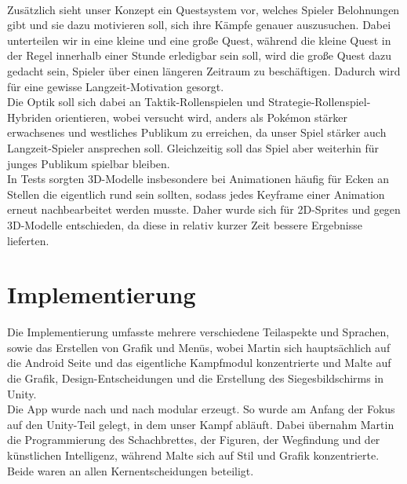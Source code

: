 \documentclass[extern,palatino]{cgBA}
\begin{document}
\\Zusätzlich sieht unser Konzept ein Questsystem vor, welches Spieler Belohnungen gibt und sie dazu motivieren soll, sich ihre Kämpfe genauer auszusuchen. Dabei unterteilen wir in eine kleine und eine große Quest, während die kleine Quest in der Regel innerhalb einer Stunde erledigbar sein soll, wird die große Quest dazu gedacht sein, Spieler über einen längeren Zeitraum zu beschäftigen. Dadurch wird für eine gewisse Langzeit-Motivation gesorgt.
\\Die Optik soll sich dabei an Taktik-Rollenspielen und Strategie-Rollenspiel-Hybriden orientieren, wobei versucht wird, anders als Pokémon stärker erwachsenes und westliches Publikum zu erreichen, da unser Spiel stärker auch Langzeit-Spieler ansprechen soll. Gleichzeitig soll das Spiel aber weiterhin für junges Publikum spielbar bleiben.  \\In Tests sorgten 3D-Modelle insbesondere bei Animationen häufig für Ecken an Stellen die eigentlich rund sein sollten, sodass jedes Keyframe einer Animation erneut nachbearbeitet werden musste. Daher wurde sich für 2D-Sprites und gegen 3D-Modelle entschieden, da diese in relativ kurzer Zeit bessere Ergebnisse lieferten.
\newpage
\section{Implementierung}
Die Implementierung umfasste mehrere verschiedene Teilaspekte und Sprachen, sowie das Erstellen von Grafik und Menüs, wobei Martin sich hauptsächlich auf die Android Seite und das eigentliche Kampfmodul konzentrierte und Malte auf die Grafik, Design-Entscheidungen und die Erstellung des Siegesbildschirms in Unity.
\\Die App wurde nach und nach modular erzeugt. So wurde am Anfang der Fokus auf den Unity-Teil gelegt, in dem unser Kampf abläuft. Dabei übernahm Martin die Programmierung des Schachbrettes, der Figuren, der Wegfindung und der künstlichen Intelligenz, während Malte sich auf Stil und Grafik konzentrierte. Beide waren an allen Kernentscheidungen beteiligt.
\end{document}

